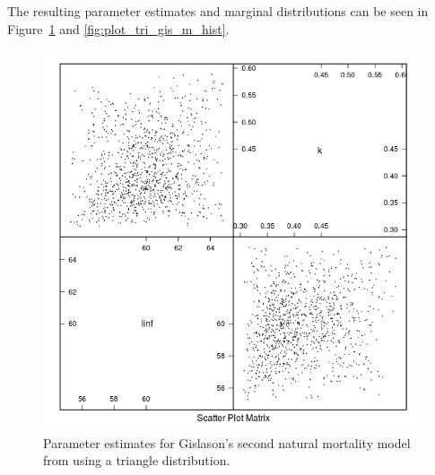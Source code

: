 \documentclass[a4paper,english,10pt]{article}\usepackage[]{graphicx}\usepackage[]{color}
\newenvironment{knitrout}{}{} %
\begin{document}
The resulting parameter estimates and marginal distributions can be seen in Figure~\ref{fig:plot_tri_gis_m} and \ref{fig:plot_tri_gis_m_hist}.

\begin{knitrout}
\color{fgcolor}\begin{figure}[H]

{\centering \includegraphics[width=.9\linewidth]{figure/plot_tri_gis_m-1} 

}

\caption[Parameter estimates for Gislason's second natural mortality model from using a triangle distribution]{Parameter estimates for Gislason's second natural mortality model from using a triangle distribution.}\label{fig:plot_tri_gis_m}
\end{figure}


\end{knitrout}
\end{document}
